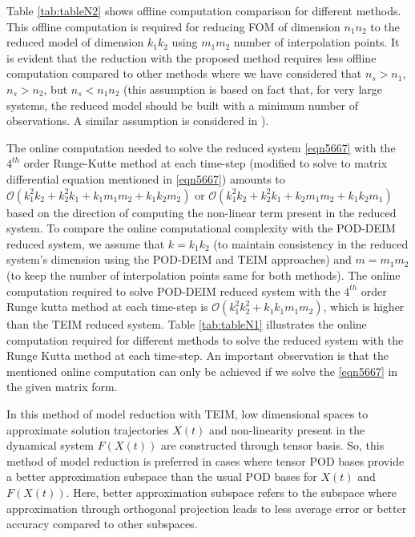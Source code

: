 \documentclass{article}
\begin{document}
Table \ref{tab:tableN2} shows offline computation comparison for different methods. This offline computation is required for reducing FOM of dimension $n_1n_2$ to the reduced model of dimension $k_1k_2$ using $m_1m_2$ number of interpolation points. It is evident that the reduction with the proposed method requires less offline computation compared to other methods where we have considered that $n_s>n_1$, $n_s>n_2$, but $n_s<n_1n_2$ (this assumption is based on fact that, for very large systems, the reduced model should be built with a minimum number of observations. A similar assumption is considered in \cite{DEIM}).

The online computation needed to solve the reduced system \eqref{eqn5667} with the $4^{th}$ order Runge-Kutte method at each time-step (modified to solve to matrix differential equation mentioned in \eqref{eqn5667}) amounts to $\mathcal{O}(k_1^2k_2+k_2^2k_1+k_1m_1m_2+k_1k_2m_2)$ or $\mathcal{O}(k_1^2k_2+k_2^2k_1+k_2m_1m_2+k_1k_2m_1)$ based on the direction of computing the non-linear term present in the reduced system. To compare the online computational complexity with the POD-DEIM reduced system, we assume that $k=k_1k_2$ (to maintain consistency in the reduced system's dimension using the POD-DEIM and TEIM approaches) and $m=m_1m_2$ (to keep the number of interpolation points same for both methods). The online computation required to solve POD-DEIM reduced system with the $4^{th}$ order Runge kutta method at each time-step is $\mathcal{O}(k_1^2k_2^2+k_1k_1m_1m_2)$, which is higher than the TEIM reduced system. Table \ref{tab:tableN1} illustrates the online computation required for different methods to solve the reduced system with the Runge Kutta method at each time-step.  An important observation is that the mentioned online computation can only be achieved if we solve the \eqref{eqn5667} in the given matrix form. 

In this method of model reduction with TEIM, low dimensional spaces to approximate solution trajectories $X(t)$ and non-linearity present in the dynamical system $F(X(t))$ are constructed through tensor basis. So, this method of model reduction is preferred in cases where tensor POD bases provide a better approximation subspace than the usual POD bases for $X(t)$ and $F(X(t))$. Here, better approximation subspace refers to the subspace where approximation through orthogonal projection leads to less average error or better accuracy compared to other subspaces.
 
\end{document}
